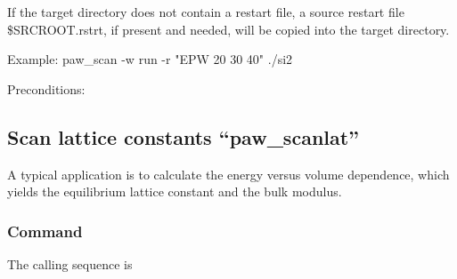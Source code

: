 \documentclass[final,12pt,makeidx,DIV=calc]{article}
\begin{document}
{{{{\begin{minipage}{0.9\linewidth}
 If the target directory does not contain a restart file,
 a source restart file \$SRCROOT.rstrt, if present and needed,
 will be copied into the target directory.

 Example:
 	 paw\_scan -w run -r "EPW 20 30 40" ./si2
\end{minipage}}

\bigskip
\noindent Preconditions:\\[2mm]
\hspace*{1cm}
\bigskip
%
\subsection{Scan lattice constants ``paw\_scanlat''}
A typical application is to calculate the energy versus volume
dependence, which yields the equilibrium lattice constant and the bulk
modulus. 

\subsubsection{Command}
The calling sequence is

\bigskip{}
\vspace{0.5cm}

}}}
\end{document}
